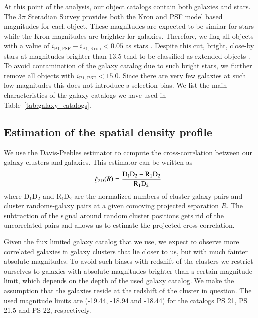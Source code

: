 \documentclass[iop, apjl, twocolappendix, numberedappendix]{emulateapj}
\begin{document}
At this point of the analysis, our object catalogs contain both
galaxies and stars. The 3$\pi$ Steradian Survey provides both the
Kron and PSF model based magnitudes for each object. These
magnitudes are expected to be similar for stars while the Kron
magnitudes are brighter for galaxies. Therefore, we flag all objects
with a value of $i_{\mathrm{P1,PSF}} - i_{\mathrm{P1,Kron}}< 0.05$
as stars \citep{farrow2013pan}. Despite this cut, bright, close-by
stars at magnitudes brighter than 13.5 tend to be classified as
extended objects \citep{chambers2016pan}. To avoid contamination of
the galaxy catalog due to such bright stars, we further remove all
objects with $i_{\mathrm{P1,PSF}} < 15.0$. Since there are very few
galaxies at such low magnitudes this does not introduce a selection
bias. We list the main characteristics of the galaxy catalogs we
have used in Table~\ref{tab:galaxy_catalogs}.

\subsection{Estimation of the spatial density profile}
\label{sec:estimators}

We use the Davis-Peebles estimator \citep{davis1983survey} to
compute the cross-correlation between our galaxy clusters and
galaxies. This estimator can be written as
\begin{equation}
\xi_{\rm 2D}(R) = \frac{\rm D_1D_2-R_1D_2}{\rm R_1D_2}\,
\end{equation}
where D$_1$D$_2$ and R$_1$D$_2$ are the normalized numbers of
cluster-galaxy pairs and cluster randoms-galaxy pairs at a given
comoving projected separation $R$. The subtraction of the signal
around random cluster positions gets rid of the uncorrelated pairs
and allows us to estimate the projected cross-correlation.

Given the flux limited galaxy catalog that we use, we expect to
observe more correlated galaxies in galaxy clusters that lie closer
to us, but with much fainter absolute magnitudes. To avoid
such biases with redshift of the clusters we restrict ourselves to
galaxies with absolute magnitudes brighter than a certain magnitude
limit, which depends on the depth of the used galaxy catalog. We
make the assumption that the galaxies reside at the redshift of the
cluster in question. The used magnitude limits are (-19.44, -18.94
and -18.44) for the catalogs PS 21, PS 21.5 and PS 22, respectively.

\end{document}
